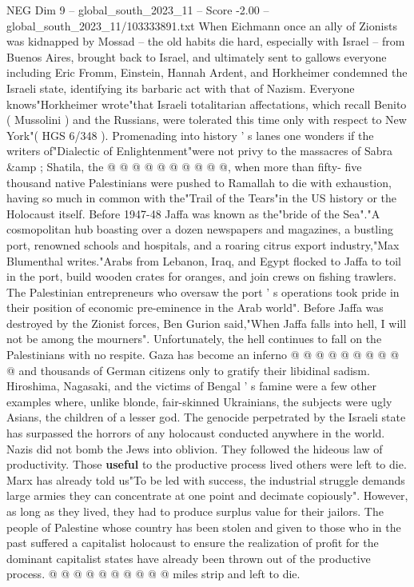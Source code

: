 \begin{textsample}{NEG Dim 9 – global\_south\_2023\_11 – Score -2.00 – global\_south\_2023\_11/103333891.txt}
When Eichmann once an ally of Zionists was kidnapped by Mossad -- the old habits die hard, especially with Israel -- from Buenos Aires, brought back to Israel, and ultimately sent to gallows everyone including Eric Fromm, Einstein, Hannah Ardent, and Horkheimer condemned the Israeli state, identifying its barbaric act with that of Nazism.
Everyone knows"Horkheimer wrote"that Israeli totalitarian affectations, which recall Benito ( Mussolini ) and the Russians, were tolerated this time only with respect to New York"( HGS 6/348 ).
Promenading into history ' s lanes one wonders if the writers of"Dialectic of Enlightenment"were not privy to the massacres of Sabra \&amp ; Shatila, the @ @ @ @ @ @ @ @ @ @, when more than fifty- five thousand native Palestinians were pushed to Ramallah to die with exhaustion, having so much in common with the"Trail of the Tears"in the US history or the Holocaust itself.
Before 1947-48 Jaffa was known as the"bride of the Sea"."A cosmopolitan hub boasting over a dozen newspapers and magazines, a bustling port, renowned schools and hospitals, and a roaring citrus export industry,"Max Blumenthal writes."Arabs from Lebanon, Iraq, and Egypt flocked to Jaffa to toil in the port, build wooden crates for oranges, and join crews on fishing trawlers.
The Palestinian entrepreneurs who oversaw the port ' s operations took pride in their position of economic pre-eminence in the Arab world".
Before Jaffa was destroyed by the Zionist forces, Ben Gurion said,"When Jaffa falls into hell, I will not be among the mourners".
Unfortunately, the hell continues to fall on the Palestinians with no respite.
Gaza has become an inferno @ @ @ @ @ @ @ @ @ @ and thousands of German citizens only to gratify their libidinal sadism.
Hiroshima, Nagasaki, and the victims of Bengal ' s famine were a few other examples where, unlike blonde, fair-skinned Ukrainians, the subjects were ugly Asians, the children of a lesser god.
The genocide perpetrated by the Israeli state has surpassed the horrors of any holocaust conducted anywhere in the world.
Nazis did not bomb the Jews into oblivion.
They followed the hideous law of productivity.
Those \textbf{useful} to the productive process lived others were left to die.
Marx has already told us"To be led with success, the industrial struggle demands large armies they can concentrate at one point and decimate copiously".
However, as long as they lived, they had to produce surplus value for their jailors.
The people of Palestine whose country has been stolen and given to those who in the past suffered a capitalist holocaust to ensure the realization of profit for the dominant capitalist states have already been thrown out of the productive process. @ @ @ @ @ @ @ @ @ @ miles strip and left to die.

\end{textsample}
